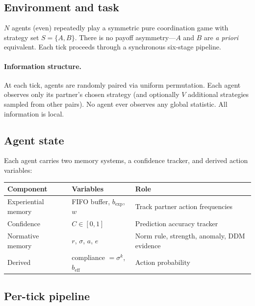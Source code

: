 \documentclass[11pt,a4paper]{article}
\begin{document}
\subsection{Environment and task}

$N$ agents (even) repeatedly play a symmetric pure coordination game with strategy set $S = \{A, B\}$. There is no payoff asymmetry---$A$ and $B$ are \emph{a priori} equivalent. Each tick proceeds through a synchronous six-stage pipeline.

\paragraph{Information structure.} At each tick, agents are randomly paired via uniform permutation. Each agent observes only its partner's chosen strategy (and optionally $V$ additional strategies sampled from other pairs). No agent ever observes any global statistic. All information is local.

\subsection{Agent state}

Each agent carries two memory systems, a confidence tracker, and derived action variables:

\begin{center}
\begin{tabular}{@{}lll@{}}
\toprule
Component & Variables & Role \\
\midrule
Experiential memory & FIFO buffer, $b_{\exp}$, $w$ & Track partner action frequencies \\
Confidence & $C \in [0,1]$ & Prediction accuracy tracker \\
Normative memory & $r$, $\sigma$, $a$, $e$ & Norm rule, strength, anomaly, DDM evidence \\
Derived & compliance $= \sigma^k$, $b_{\mathrm{eff}}$ & Action probability \\
\bottomrule
\end{tabular}
\end{center}

\subsection{Per-tick pipeline}
\end{document}
